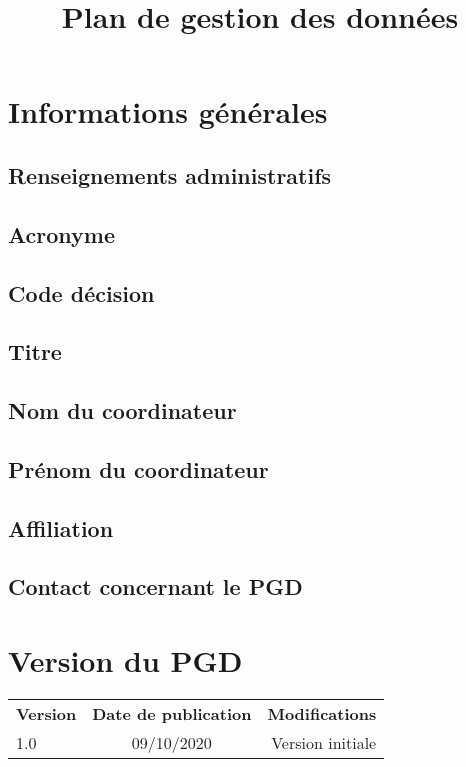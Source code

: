 \documentclass{article}
\title{Plan de gestion des données}
\author{}
\date{}
\begin{document}
\begin{titlepage}
\maketitle
\bigskip
\section*{Informations générales}
\subsection* {Renseignements administratifs}
\subsection*{Acronyme}
\subsection*{Code décision}
\subsection*{Titre}
\subsection*{Nom du coordinateur}
\subsection*{Prénom du coordinateur}
\subsection*{Affiliation}
\subsection*{Contact concernant le PGD}

\bigskip
\bigskip
\section*{Version du PGD}
\begin{tabular}{ l | c | r }
   \textbf{Version} & \textbf{Date de publication} & \textbf{Modifications} \\
   1.0 & 09/10/2020 & Version initiale \\
\end{tabular}
\end{titlepage}
\end{document}
